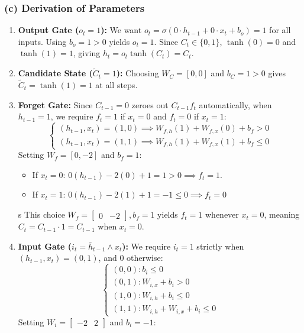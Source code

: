 \documentclass[11pt,english]{article}
\begin{document}
\begin{enumerate}[resume]
\newpage
\subsubsection*{(c) Derivation of Parameters}
\begin{enumerate}
    \item \textbf{Output Gate ($o_t = 1$):} We want $o_t = \sigma(0 \cdot h_{t-1} + 0 \cdot x_t + b_o) = 1$ for all inputs. Using $b_o = 1 > 0$ yields $o_t = 1$. Since $C_t \in \{0, 1\}$, $\tanh(0) = 0$ and $\tanh(1) = 1$, giving $h_t = o_t \tanh(C_t) = C_t$.
    \item \textbf{Candidate State ($\tilde{C}_t = 1$):} Choosing $W_C = [0, 0]$ and $b_C = 1 > 0$ gives $\tilde{C}_t = \tanh(1) = 1$ at all steps.
    \item \textbf{Forget Gate:} 
    Since $C_{t-1} = 0$ zeroes out $C_{t-1} f_t$ automatically, when $h_{t-1} = 1$, we require $f_t = 1$ if $x_t = 0$ and $f_t = 0$ if $x_t = 1$:
    \[
    \begin{cases}
    (h_{t-1}, x_t) = (1, 0) \implies W_{f, h}(1) + W_{f, x}(0) + b_f > 0 \\
    (h_{t-1}, x_t) = (1, 1) \implies W_{f, h}(1) + W_{f, x}(1) + b_f \le 0
    \end{cases}
    \]
    Setting $W_f = [0, -2]$ and $b_f = 1$:
    \begin{itemize}
            \item If $x_t = 0$: $0(h_{t-1}) - 2(0) + 1 = 1 > 0 \implies f_t = 1$.
            \item If $x_t = 1$: $0(h_{t-1}) - 2(1) + 1 = -1 \le 0 \implies f_t = 0$
    \end{itemize}s
    This choice $W_f = \begin{bmatrix} 0 & -2 \end{bmatrix}, b_f = 1$ yields $f_t = 1$ whenever $x_t = 0$, meaning $C_t = C_{t-1} \cdot 1 = C_{t-1}$ when $x_t = 0$.
    \item \textbf{Input Gate ($i_t = \bar{h}_{t-1} \land x_t$):}
    We require $i_t = 1$ strictly when $(h_{t-1}, x_t) = (0, 1)$, and $0$ otherwise:
    \[
    \begin{cases}
    (0, 0): b_i \le 0 \\
    (0, 1): W_{i, x} + b_i > 0 \\
    (1, 0): W_{i, h} + b_i \le 0 \\
    (1, 1): W_{i, h} + W_{i, x} + b_i \le 0
    \end{cases}
    \]
    Setting $W_i = \begin{bmatrix} -2 & 2 \end{bmatrix}$ and $b_i = -1$:

\end{enumerate}
\end{enumerate}
\end{document}
